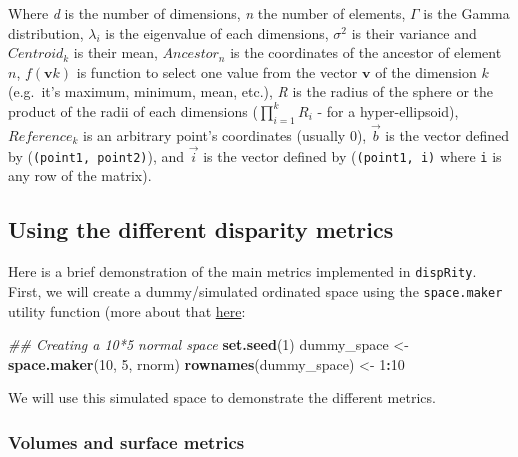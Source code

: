 \documentclass[]{book}
\newenvironment{Shaded}{\begin{snugshade}}{\end{snugshade}}
\newcommand{\CommentTok}[1]{\textcolor[rgb]{0.56,0.35,0.01}{\textit{#1}}}
\newcommand{\DecValTok}[1]{\textcolor[rgb]{0.00,0.00,0.81}{#1}}
\newcommand{\KeywordTok}[1]{\textcolor[rgb]{0.13,0.29,0.53}{\textbf{#1}}}
\newcommand{\NormalTok}[1]{#1}
\newcommand{\OperatorTok}[1]{\textcolor[rgb]{0.81,0.36,0.00}{\textbf{#1}}}
\newcommand{\StringTok}[1]{\textcolor[rgb]{0.31,0.60,0.02}{#1}}
\begin{document}
Where \emph{d} is the number of dimensions,
\emph{n} the number of elements,
\(\Gamma\) is the Gamma distribution,
\(\lambda_i\) is the eigenvalue of each dimensions,
\(\sigma^{2}\) is their variance and
\(Centroid_{k}\) is their mean,
\(Ancestor_{n}\) is the coordinates of the ancestor of element \(n\),
\(f(\mathbf{v}k)\) is function to select one value from the vector \(\mathbf{v}\) of the dimension \(k\) (e.g.~it's maximum, minimum, mean, etc.),
\emph{R} is the radius of the sphere or the product of the radii of each dimensions (\(\displaystyle\prod_{i=1}^{k}R_{i}\) - for a hyper-ellipsoid),
\(Reference_{k}\) is an arbitrary point's coordinates (usually 0),
\(\overrightarrow{b}\) is the vector defined by (\texttt{(point1,\ point2)}),
and \(\overrightarrow{i}\) is the vector defined by (\texttt{(point1,\ i)} where \texttt{i} is any row of the matrix).

\hypertarget{using-the-different-disparity-metrics}{%
\subsection{Using the different disparity metrics}\label{using-the-different-disparity-metrics}}

Here is a brief demonstration of the main metrics implemented in \texttt{dispRity}.
First, we will create a dummy/simulated ordinated space using the \texttt{space.maker} utility function (more about that \protect\hyperlink{space.maker}{here}:

\begin{Shaded}
\begin{Highlighting}[]
\CommentTok{## Creating a 10*5 normal space}
\KeywordTok{set.seed}\NormalTok{(}\DecValTok{1}\NormalTok{)}
\NormalTok{dummy_space <-}\StringTok{ }\KeywordTok{space.maker}\NormalTok{(}\DecValTok{10}\NormalTok{, }\DecValTok{5}\NormalTok{, rnorm)}
\KeywordTok{rownames}\NormalTok{(dummy_space) <-}\StringTok{ }\DecValTok{1}\OperatorTok{:}\DecValTok{10}
\end{Highlighting}
\end{Shaded}

We will use this simulated space to demonstrate the different metrics.

\hypertarget{volumes-and-surface-metrics}{%
\subsubsection{Volumes and surface metrics}\label{volumes-and-surface-metrics}}
\end{document}
